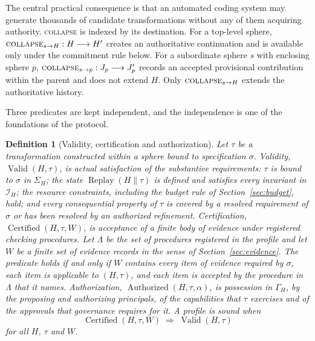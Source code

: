 \documentclass[11pt]{article}
\newtheorem{definition}{Definition}
\theoremstyle{remark}
\newcommand{\Replay}{\operatorname{Replay}}
\newcommand{\Adm}{\operatorname{Valid}}
\newcommand{\Admcert}{\operatorname{Certified}}
\newcommand{\Auth}{\operatorname{Authorized}}
\newcommand{\concat}{\mathbin{\|}}
\newcommand{\COLLAPSE}{\textsc{collapse}}
\begin{document}
The central practical consequence is that an automated coding system may generate thousands of candidate transformations without any of them acquiring authority. \COLLAPSE{} is indexed by its destination. For a top-level sphere, $\COLLAPSE_{s\to H}:H\longrightarrow H'$ creates an authoritative continuation and is available only under the commitment rule below. For a subordinate sphere $s$ with enclosing sphere $p$, $\COLLAPSE_{s\to p}:J_p\longrightarrow J_p'$ records an accepted provisional contribution within the parent and does not extend $H$. Only $\COLLAPSE_{s\to H}$ extends the authoritative history.

Three predicates are kept independent, and the independence is one of the foundations of the protocol.

\begin{definition}[Validity, certification and authorization]
Let $\tau$ be a transformation constructed within a sphere bound to specification $\sigma$.
\emph{Validity}, $\Adm(H,\tau)$, is actual satisfaction of the substantive requirements: $\tau$ is bound to $\sigma$ in $\Sigma_H$; the state $\Replay(H\concat\tau)$ is defined and satisfies every invariant in $\mathcal I_H$; the resource constraints, including the budget rule of Section~\ref{sec:budget}, hold; and every consequential property of $\tau$ is covered by a resolved requirement of $\sigma$ or has been resolved by an authorized refinement.
\emph{Certification}, $\Admcert(H,\tau,W)$, is acceptance of a finite body of evidence under registered checking procedures. Let $\Lambda$ be the set of procedures registered in the profile and let $W$ be a finite set of evidence records in the sense of Section~\ref{sec:evidence}. The predicate holds if and only if $W$ contains every item of evidence required by $\sigma$, each item is applicable to $(H,\tau)$, and each item is accepted by the procedure in $\Lambda$ that it names.
\emph{Authorization}, $\Auth(H,\tau,\alpha)$, is possession in $\Gamma_H$, by the proposing and authorizing principals, of the capabilities that $\tau$ exercises and of the approvals that governance requires for it.
A profile is \emph{sound} when
\[
\Admcert(H,\tau,W)\;\Longrightarrow\;\Adm(H,\tau)
\]
for all $H$, $\tau$ and $W$.
\end{definition}
\end{document}
